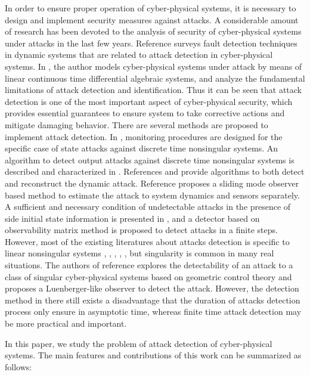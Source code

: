 \documentclass[english]{cccconf}
\theoremstyle{definition}
\begin{document}
In order to ensure proper operation of cyber-physical systems, it is necessary to design and implement security measures against attacks.  A considerable amount of research has been devoted to the analysis of  security of cyber-physical systems under attacks in the last few years. Reference \cite{A1976CV71500005} surveys fault detection techniques in dynamic systems that are related to attack detection in cyber-physical systems. In \cite{6545301}, the author models cyber-physical systems under attack by means of linear continuous time differential algebraic systems, and analyze the fundamental limitations of attack detection and identification. Thus it can be seen that attack detection is one of the most important aspect of cyber-physical security, which  provides essential guarantees to ensure system to take corrective actions and mitigate damaging behavior. There are several methods are proposed to implement attack detection. In \cite{Sundaram2011Distributed}, \cite{Pasqualetti2010Consensus} monitoring procedures are designed for the specific case of state attacks against discrete time nonsingular systems. An algorithm to detect output attacks against discrete time nonsingular systems is described and characterized in \cite{Fawzi2011Secure}. References \cite{Fawzi2012Secure} and \cite{Shoukry2016Event} provide algorithms to both detect and reconstruct the dynamic attack. Reference \cite{Ao2016Adaptive} proposes a sliding mode observer based
method to estimate the attack to system dynamics and sensors
separately. A sufficient and necessary condition of undetectable attacks in the presence of side initial state information is
presented in \cite{Chen2016Dynamic}, and a detector based on observability matrix method is proposed to detect attacks in a finite steps. However, most of the existing literatures about attacks detection is specific to linear nonsingular systems \cite{Sundaram2011Distributed}, \cite{Pasqualetti2010Consensus}, \cite{Fawzi2011Secure}, \cite{Ao2016Adaptive}, \cite{Chen2016Dynamic}, but singularity is common in many real situations.  The authors of reference \cite{6545301} explores the detectability of an attack to a class of singular cyber-physical systems based on geometric control theory and proposes a Luenberger-like observer to detect the attack. However, the detection method in \cite{6545301} there still exists a disadvantage that
 the duration of attacks detection process only ensure in asymptotic time, whereas finite time attack detection may be more practical and important.

In this paper, we study the problem of attack detection of cyber-physical systems. The main features and contributions of this work can be summarized as follows:
\end{document}
